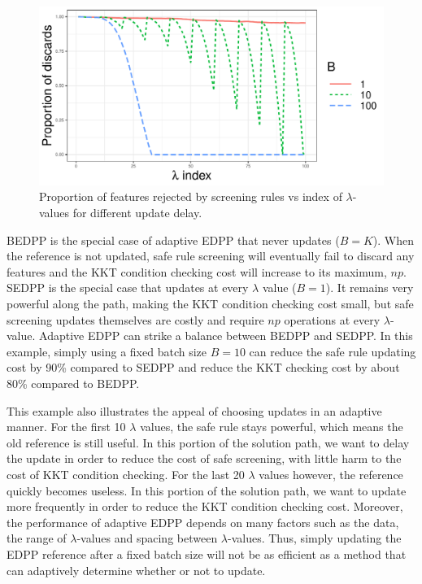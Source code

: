 \begin{figure}[ht]
    \centering
    \includegraphics[scale = 0.6]{plots/batchsizes.pdf}    \caption{Proportion of features rejected by screening rules vs index of $\lambda$-values for different update delay.}
    \label{fig:batchsizes}
\end{figure}

BEDPP is the special case of adaptive EDPP that never updates ($B=K$). When the reference is not updated, safe rule screening will eventually fail to discard any features and the KKT condition checking cost will increase to its maximum, $np$. SEDPP is the special case that updates at every $\lambda$ value ($B=1$). It remains very powerful along the path, making the KKT condition checking cost small, but safe screening updates themselves are costly and require $np$ operations at every $\lambda$-value. Adaptive EDPP can strike a balance between BEDPP and SEDPP. In this example, simply using a fixed batch size $B=10$ can reduce the safe rule updating cost by 90\% compared to SEDPP and reduce the KKT checking cost by about 80\% compared to BEDPP.

This example also illustrates the appeal of choosing updates in an adaptive manner. For the first 10 $\lambda$ values, the safe rule stays powerful, which means the old reference is still useful. In this portion of the solution path, we want to delay the update in order to reduce the cost of safe screening, with little harm to the cost of KKT condition checking. For the last 20 $\lambda$ values however, the reference quickly becomes useless. In this portion of the solution path, we want to update more frequently in order to reduce the KKT condition checking cost. Moreover, the performance of adaptive EDPP depends on many factors such as the data, the range of $\lambda$-values and spacing between $\lambda$-values. Thus, simply updating the EDPP reference after a fixed batch size will not be as efficient as a method that can adaptively determine whether or not to update.


